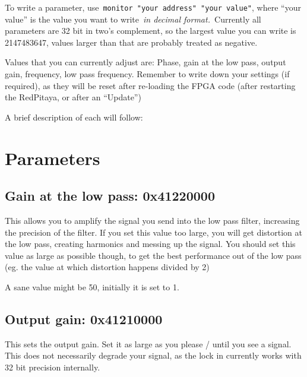 \documentclass[10pt]{article}
\begin{document}
\par\null

To write a parameter,
use~\texttt{monitor\ "your\ address"\ "your\ value"}, where ``your
value'' is the value you want to write~\emph{in decimal
format.~}Currently all parameters are 32 bit in two's complement, so the
largest value you can write is 2147483647, values larger than that are
probably treated as negative.

\par\null

Values that you can currently adjust are: Phase, gain at the low pass,
output gain, frequency, low pass frequency. Remember to write down your
settings (if required), as they will be reset after re-loading the FPGA
code (after restarting the RedPitaya, or after an ``Update'')

A brief description of each will follow:

\par\null

\section*{Parameters}

{\label{387076}}\par\null

\subsection*{Gain at the low pass:
0x41220000}

{\label{376112}}

This allows you to amplify the signal you send into the low pass filter,
increasing the precision of the filter. If you set this value too large,
you will get distortion at the low pass, creating harmonics and messing
up the signal. You should set this value as large as possible though, to
get the best performance out of the low pass (eg. the value at which
distortion happens divided by 2)

A sane value might be 50, initially it is set to 1.

\par\null

\subsection*{Output gain: 0x41210000}

{\label{646392}}

This sets the output gain. Set it as large as you please / until you see
a signal. This does not necessarily degrade your signal, as the lock in
currently works with 32 bit precision internally.
\end{document}
